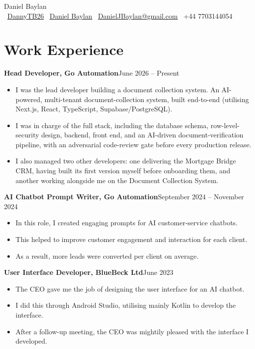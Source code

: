 \documentclass[11pt,a4paper]{article}
\newcommand{\entry}[2]{\noindent\textbf{#1}\hfill #2\par\vspace{2pt}}
\begin{document}
\begin{center}
  {\Huge\color{accent} Daniel Baylan}\\[8pt]
  \faGithub~\href{https://github.com/DannyTB26}{DannyTB26} \quad\textbar\quad
  \faLinkedin~\href{https://www.linkedin.com/in/daniel-baylan-17943032a/}{Daniel Baylan} \quad\textbar\quad
  \faEnvelope~\href{mailto:DanielJBaylan@gmail.com}{DanielJBaylan@gmail.com} \quad\textbar\quad
  \faPhone~+44 7703144054
\end{center}

\section*{Work Experience}
\entry{Head Developer, Go Automation}{June 2026 -- Present}
\begin{itemize}
  \item I was the lead developer building a document collection system. An AI-powered, multi-tenant document-collection system, built end-to-end (utilising Next.js, React, TypeScript, Supabase\slash PostgreSQL).
  \item I was in charge of the full stack, including the database schema, row-level-security design, backend, front end, and an AI-driven document-verification pipeline, with an adversarial code-review gate before every production release.
  \item I also managed two other developers: one delivering the Mortgage Bridge CRM, having built its first version myself before onboarding them, and another working alongside me on the Document Collection System.
\end{itemize}

\entry{AI Chatbot Prompt Writer, Go Automation}{September 2024 -- November 2024}
\begin{itemize}
  \item In this role, I created engaging prompts for AI customer-service chatbots.
  \item This helped to improve customer engagement and interaction for each client.
  \item As a result, more leads were converted per client on average.
\end{itemize}

\entry{User Interface Developer, BlueBeck Ltd}{June 2023}
\begin{itemize}
  \item The CEO gave me the job of designing the user interface for an AI chatbot.
  \item I did this through Android Studio, utilising mainly Kotlin to develop the interface.
  \item After a follow-up meeting, the CEO was mightily pleased with the interface I developed.
\end{itemize}
\end{document}
